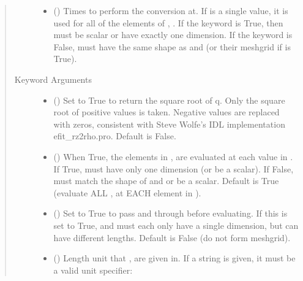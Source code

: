 \documentclass[letterpaper,10pt,english]{sphinxmanual}
\begin{document}
\begin{fulllineitems}
\begin{fulllineitems}
\begin{quote}
\begin{description}
\begin{itemize}
\item {} 
 () \textendash{} Times to perform the conversion at.
If  is a single value, it is used for all of the elements of
, . If the  keyword is True, then  must be
scalar or have exactly one dimension. If the  keyword is
False,  must have the same shape as  and  (or their
meshgrid if  is True).

\end{itemize}

\item[{Keyword Arguments}] \leavevmode\begin{itemize}
\item {} 
 () \textendash{} Set to True to return the square root of q.
Only the square root of positive values is taken. Negative
values are replaced with zeros, consistent with Steve Wolfe’s
IDL implementation efit\_rz2rho.pro. Default is False.

\item {} 
 () \textendash{} When True, the elements in ,  are evaluated
at each value in . If True,  must have only one dimension
(or be a scalar). If False,  must match the shape of  and
 or be a scalar. Default is True (evaluate ALL ,  at
EACH element in ).

\item {} 
 () \textendash{} Set to True to pass  and  through
 before evaluating. If this is set to
True,  and  must each only have a single dimension, but
can have different lengths. Default is False (do not form
meshgrid).

\item {} 
 () \textendash{} 
Length unit that ,  are given in.
If a string is given, it must be a valid unit specifier:
\begin{quote}



\end{quote}
\end{itemize}
\end{description}
\end{quote}
\end{fulllineitems}
\end{fulllineitems}
\end{document}
